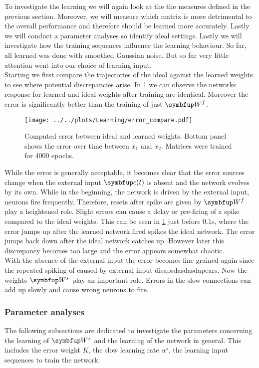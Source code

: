 To investigate the learning we will again look at the the measures defined in the previous section. Moreover, we will measure which matrix is more detrimental to the overall performance and therefore should be learned more accurately. Lastly we will conduct a parameter analyses so identify ideal settings. Lastly we will investigate how the training sequences influence the learning behaviour. So far, all learned was done with smoothed Gaussian noise. But so far very little attention went into our choice of learning input.\\
Starting we first compare the trajectories of the ideal against the learned weights to see where potential discrepancies arise. In \cref{fig:Ws_ideal_learned_compare} we can observe the networks response for learned and ideal weights after training are identical. Moreover the error is significantly better than the training of just $\bmu{W}^f$.
\begin{figure}
	\centering
	\texttt{[image: ../../plots/Learning/error\_compare.pdf]}
	\caption{Computed error between ideal and learned weights. Bottom panel shows the error over time between $x_1$ and $x_2$. Matrices were trained for 4000 epochs.}
	\label{fig:Ws_ideal_learned_compare}
\end{figure}
While the error is generally acceptable, it becomes clear that the error sources change when the external input $\bmu{c}(t)$ is absent and the network evolves by its own. While in the beginning, the network is driven by the external input, neurons fire frequently. Therefore, resets after spike are given by $\bmu{W}^f$ play a heightened role. Slight errors can cause a delay or pre-firing of a spike compared to the ideal weights. This can be seen in \cref{fig:Ws_ideal_learned_compare} just before $0.1$s, where the error jumps up after the learned network fired spikes the ideal network. The error jumps back down after the ideal network catches up. However later this discrepancy becomes too large and the error appears somewhat chaotic.\\
With the absence of the external input the error becomes fine grained again since the repeated spiking of caused by external input disapsdasdasdapears. Now the weights $\bmu{W}^s$ play an important role. Errors in the slow connections can add up slowly and cause wrong neurons to fire.\\

\subsubsection{Parameter analyses}
The following subsections are dedicated to investigate the parameters concerning the learning of $\bmu{W}^s$ and the learning of the network in general. This includes the error weight $K$, the slow learning rate $\alpha^s$, the learning input sequences to train the network.
